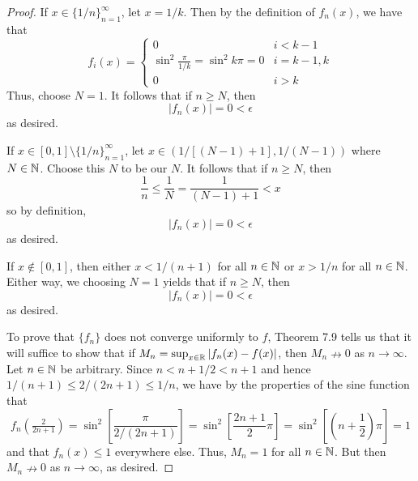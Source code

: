 \documentclass[../psets.tex]{subfiles}
\begin{document}
\begin{enumerate}[label={\textbf{\arabic*.}}]
\begin{proof}
        If $x\in\{1/n\}_{n=1}^\infty$, let $x=1/k$. Then by the definition of $f_n(x)$, we have that
        \begin{equation*}
            f_i(x) =
            \begin{cases}
                0 & i<k-1\\
                \sin^2\frac{\pi}{1/k}=\sin^2k\pi=0 & i=k-1,k\\
                0 & i>k
            \end{cases}
        \end{equation*}
        Thus, choose $N=1$. It follows that if $n\geq N$, then
        \begin{equation*}
            |f_n(x)| = 0 < \epsilon
        \end{equation*}
        as desired.\par
        If $x\in[0,1]\setminus\{1/n\}_{n=1}^\infty$, let $x\in(1/[(N-1)+1],1/(N-1))$ where $N\in\mathbb{N}$. Choose this $N$ to be our $N$. It follows that if $n\geq N$, then
        \begin{equation*}
            \frac{1}{n} \leq \frac{1}{N}
            = \frac{1}{(N-1)+1}
            < x
        \end{equation*}
        so by definition,
        \begin{equation*}
            |f_n(x)| = 0 < \epsilon
        \end{equation*}
        as desired.\par
        If $x\notin[0,1]$, then either $x<1/(n+1)$ for all $n\in\mathbb{N}$ or $x>1/n$ for all $n\in\mathbb{N}$. Either way, we choosing $N=1$ yields that if $n\geq N$, then
        \begin{equation*}
            |f_n(x)| = 0 < \epsilon
        \end{equation*}
        as desired.\par\medskip
        To prove that $\{f_n\}$ does not converge uniformly to $f$, Theorem 7.9 tells us that it will suffice to show that if $M_n=\sup_{x\in\mathbb{R}}|f_n(x)-f(x)|$, then $M_n\nrightarrow 0$ as $n\to\infty$. Let $n\in\mathbb{N}$ be arbitrary. Since $n<n+1/2<n+1$ and hence $1/(n+1)\leq 2/(2n+1)\leq 1/n$, we have by the properties of the sine function that
        \begin{equation*}
            f_n(\tfrac{2}{2n+1}) = \sin^2\left[ \frac{\pi}{2/(2n+1)} \right]
            = \sin^2\left[ \frac{2n+1}{2}\pi \right]
            = \sin^2\left[ \left( n+\frac{1}{2} \right)\pi \right]
            = 1
        \end{equation*}
        and that $f_n(x)\leq 1$ everywhere else. Thus, $M_n=1$ for all $n\in\mathbb{N}$. But then $M_n\nrightarrow 0$ as $n\to\infty$, as desired.\par\medskip

\end{proof}
\end{enumerate}
\end{document}

